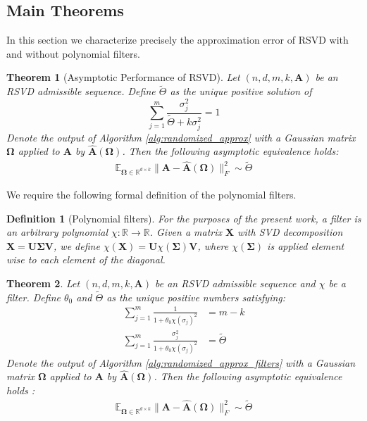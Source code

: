 \documentclass[conference]{IEEEtran}
\newcommand{\bSigma}{\bm{\Sigma}}
\newcommand{\bOmega}{\bm{\Omega}}
\newcommand{\tTheta}{\tilde{\Theta}}
\newcommand{\bA}{\mathbf{A}}
\newcommand{\bB}{\mathbf{B}}
\newcommand{\bU}{\mathbf{U}}
\newcommand{\bV}{\mathbf{V}}
\newcommand{\bX}{\mathbf{X}}
\newcommand{\bbE}{\mathbb{E}}
\newcommand{\bbR}{\mathbb{R}}
\newtheorem{theorem}{Theorem}
\newtheorem{definition}{Definition}
\begin{document}
\subsection{Main Theorems}
In this section we characterize precisely the approximation error of RSVD with and without polynomial filters.
\begin{theorem}[Asymptotic Performance of RSVD]\label{thm: err}
    Let $(n, d, m, k, \bA)$ be an RSVD admissible sequence. Define $\tTheta$ as the unique positive solution of
    $$\sum_{j=1}^{m} \frac{\sigma^2_j}{\tTheta+k\sigma^2_j} = 1$$
    Denote the output of Algorithm \ref{alg:randomized_approx} with a Gaussian matrix $\bOmega$ applied to $\bA$ by $\hat{\bA}(\bOmega)$. Then the following asymptotic equivalence holds: 
    \begin{align*}
        \bbE_{\bOmega \in \bbR^{d \times k}} \|\bA - \hat{\bA}(\bOmega)\|_F^2  \sim \tTheta
    \end{align*}
\end{theorem}
We require the following formal definition of the polynomial filters.
\begin{definition}[Polynomial filters]
    For the purposes of the present work, a filter is an arbitrary polynomial $\chi: \bbR \to \bbR$. Given a matrix $\bX$ with SVD decomposition $\bX = \bU \bSigma \bV$, we define $\chi(\bX) = \bU \chi(\bSigma) \bV$, where $\chi(\bSigma)$ is applied element wise to each element of the diagonal. 
\end{definition}

\begin{theorem}\label{thm: err_filt}
    Let $(n, d, m, k, \bA)$ be an RSVD admissible sequence and $\chi$ be a filter. Define $\theta_0$ and $\tTheta$ as the unique positive numbers satisfying: 
    \begin{align*}
        \sum_{j=1}^m \frac{1}{1 + \theta_0 \chi(\sigma_j)^2} &= m - k \\
        \sum_{j=1}^m \frac{\sigma_j^2}{1 + \theta_0\chi(\sigma_j)^2} &= \tTheta 
    \end{align*}
     Denote the output of Algorithm \ref{alg:randomized_approx_filters} with a Gaussian matrix $\bOmega$ applied to $\bA$ by $\hat{\bA}(\bOmega)$. Then the following asymptotic equivalence holds :
    \begin{align*}
        \bbE_{\bOmega \in \bbR^{d \times k}}  \|\bA - \hat{\bA}(\bOmega)\|_F^2  \sim \tTheta
    \end{align*}
\end{theorem}
\end{document}
